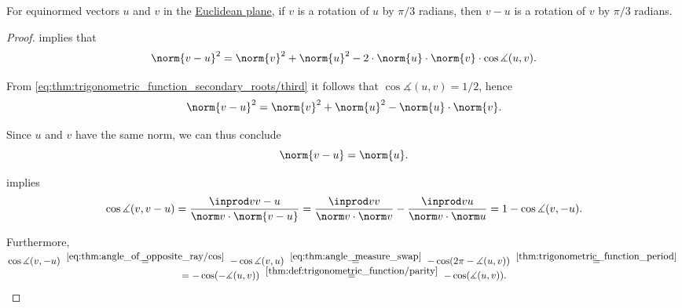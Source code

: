 \begin{lemma}\label{thm:v_minus_u_as_rotation}
  For equinormed vectors \( u \) and \( v \) in the \hyperref[def:euclidean_plane]{Euclidean plane}, if \( v \) is a rotation of \( u \) by \( \pi / 3 \) radians, then \( v - u \) is a rotation of \( v \) by \( \pi / 3 \) radians.
\end{lemma}
\begin{proof}
    implies that
  \begin{equation*}
    \norm{v - u}^2 = \norm{v}^2 + \norm{u}^2 - 2 \cdot \norm{u} \cdot \norm{v} \cdot \cos\measuredangle(u, v).
  \end{equation*}

  From \eqref{eq:thm:trigonometric_function_secondary_roots/third} it follows that \( \cos\measuredangle(u, v) = 1 / 2 \), hence
  \begin{equation*}
    \norm{v - u}^2 = \norm{v}^2 + \norm{u}^2 - \norm{u} \cdot \norm{v}.
  \end{equation*}

  Since \( u \) and \( v \) have the same norm, we can thus conclude
  \begin{equation}\label{eq:thm:v_minus_u_as_rotation/v_minus_u_norm}
    \norm{v - u} = \norm{u}.
  \end{equation}

    implies
  \begin{equation}\label{eq:thm:v_minus_u_as_rotation/proof/cos_v_and_minus_u/main}
    \cos \measuredangle(v, v - u)
    =
    \frac {\inprod v {v - u}} {\norm v \cdot \norm {v - u}}
    =
    \frac {\inprod v v} {\norm v \cdot \norm v}
    -
    \frac {\inprod v u} {\norm v \cdot \norm u}
    =
    1 - \cos\measuredangle(v, -u).
  \end{equation}

  Furthermore,
  \begin{multline*}
    \cos \measuredangle(v, -u)
    \reloset {\eqref{eq:thm:angle_of_opposite_ray/cos}} =
    -\cos \measuredangle(v, u)
    \reloset {\eqref{eq:thm:angle_measure_swap}} =
    -\cos(2\pi - \measuredangle(u, v))
    \reloset {\ref{thm:trigonometric_function_period}} = \\ =
    -\cos(-\measuredangle(u, v))
    \reloset {\ref{thm:def:trigonometric_function/parity}} =
    -\cos(\measuredangle(u, v)).
  \end{multline*}


\end{proof}
